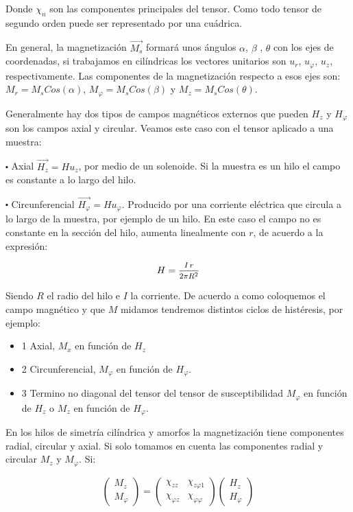 Donde $\chi_{n}$ son las componentes principales del tensor. Como todo tensor de segundo orden puede ser representado por una cuádrica.

En general, la magnetización $\overrightarrow{M_{s}}$ formará unos ángulos $\alpha$, $\beta$ , $\theta$ con los ejes de coordenadas, si trabajamos en cilíndricas los vectores unitarios son $u_{r}$, $u_{\varphi}$, $u_{z}$, respectivamente. Las componentes de la magnetización respecto a esos ejes son: $M_{r}=M_{s}Cos(\alpha)$, $M_{\varphi}=M_{s}Cos(\beta)$ y $M_{z}=M_{s}Cos(\theta)$.

Generalmente hay dos tipos de campos magnéticos externos que pueden $H_{z}$ y $H_{\varphi}$ son los campos axial y circular. Veamos este caso con el tensor aplicado a una muestra:


$\centerdot$ Axial $\overrightarrow{H_{z}}=Hu_{z}$, por medio de un solenoide. Si la muestra es un hilo el campo es constante a lo largo del hilo.
	
$\centerdot$ Circunferencial $\overrightarrow{H_{\varphi}}=Hu_{\varphi}$. Producido por una corriente eléctrica que circula a lo largo de la muestra, por ejemplo de un hilo. En este caso el campo no es constante en la sección del hilo, aumenta linealmente con $r$, de acuerdo a la expresión:

\begin{equation*}
H=\mfrac{I\, r}{2\pi R^{2}}
\end{equation*}

Siendo $R$ el radio del hilo e $I$ la corriente. De acuerdo a como coloquemos el campo magnético y que $M$ midamos tendremos distintos ciclos de histéresis, por ejemplo:
\begin{itemize}
\item{1} Axial, $M_{x}$ en función de $H_{z}$

\item{2} Circunferencial, $M_{\varphi}$ en función de $H_{\varphi}$.

\item{3} Termino no diagonal del tensor del tensor de susceptibilidad $M_{\varphi}$ en función de $H_{z}$ o $M_{z}$ en función de $H_{\varphi}$.

\end{itemize}

En los hilos de simetría cilíndrica y amorfos la magnetización tiene componentes radial, circular y axial. Si solo tomamos en cuenta las componentes radial y circular $M_{z}$ y $M_{\varphi}$. Si:

	\begin{equation}
\begin{pmatrix}
M_{z}\\
M_{\varphi}
\end{pmatrix}		
=
\begin{pmatrix}
\chi_{zz} & \chi_{z\varphi1} \\
\chi_{\varphi z} & \chi_{\varphi\varphi} 
\end{pmatrix}		
\begin{pmatrix}
H_{z}\\
H_{\varphi}
\end{pmatrix}		
	\end{equation}	

